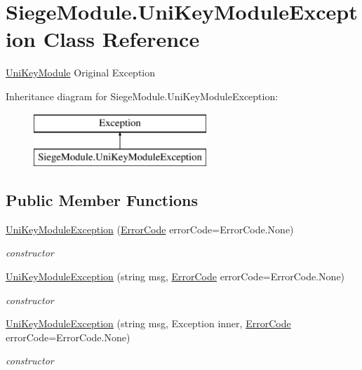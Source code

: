 \hypertarget{class_siege_module_1_1_uni_key_module_exception}{}\section{Siege\+Module.\+Uni\+Key\+Module\+Exception Class Reference}
\label{class_siege_module_1_1_uni_key_module_exception}


\mbox{\hyperlink{class_siege_module_1_1_uni_key_module}{Uni\+Key\+Module}} Original Exception  


Inheritance diagram for Siege\+Module.\+Uni\+Key\+Module\+Exception\+:\begin{figure}[H]
\begin{center}
\leavevmode
\includegraphics[height=2.000000cm]{class_siege_module_1_1_uni_key_module_exception}
\end{center}
\end{figure}
\subsection*{Public Member Functions}
\begin{DoxyCompactItemize}
\item 
\mbox{\hyperlink{class_siege_module_1_1_uni_key_module_exception_a0290bb9e9b14d83bdbe553c6a8a521f2}{Uni\+Key\+Module\+Exception}} (\mbox{\hyperlink{class_siege_module_1_1_uni_key_module_exception_ab0d37362fd3adf3ef985e3c5b8383be6}{Error\+Code}} error\+Code=Error\+Code.\+None)
\begin{DoxyCompactList}\small\item\em constructor \end{DoxyCompactList}\item 
\mbox{\hyperlink{class_siege_module_1_1_uni_key_module_exception_ab4d369837a09f843ff7b083844c9333c}{Uni\+Key\+Module\+Exception}} (string msg, \mbox{\hyperlink{class_siege_module_1_1_uni_key_module_exception_ab0d37362fd3adf3ef985e3c5b8383be6}{Error\+Code}} error\+Code=Error\+Code.\+None)
\begin{DoxyCompactList}\small\item\em constructor \end{DoxyCompactList}\item 
\mbox{\hyperlink{class_siege_module_1_1_uni_key_module_exception_af25eb96982f1282df0b7267e64be5915}{Uni\+Key\+Module\+Exception}} (string msg, Exception inner, \mbox{\hyperlink{class_siege_module_1_1_uni_key_module_exception_ab0d37362fd3adf3ef985e3c5b8383be6}{Error\+Code}} error\+Code=Error\+Code.\+None)
\begin{DoxyCompactList}\small\item\em constructor \end{DoxyCompactList}\end{DoxyCompactItemize}
